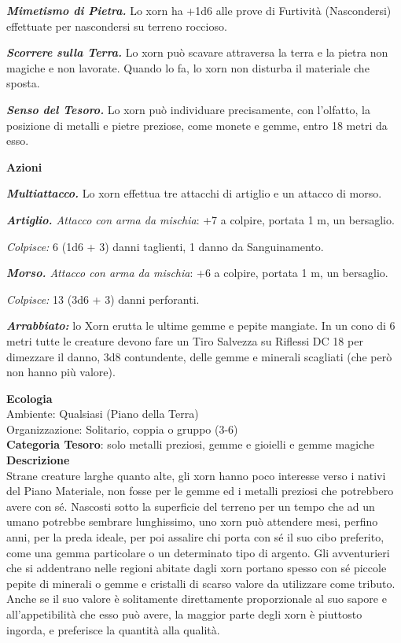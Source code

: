 \begin{multicols}{2}
{\emph{\textbf{Mimetismo di Pietra.}} Lo xorn ha +1d6 alle prove di Furtività (Nascondersi) effettuate per nascondersi su terreno roccioso.

\emph{\textbf{Scorrere sulla Terra.}} Lo xorn può scavare attraversa la terra e la pietra non magiche e non lavorate. Quando lo fa, lo xorn non disturba il materiale che sposta.

\emph{\textbf{Senso del Tesoro.}} Lo xorn può individuare precisamente, con l'olfatto, la posizione di metalli e pietre preziose, come monete e gemme, entro 18 metri da esso.

\textbf{Azioni}

\emph{\textbf{Multiattacco.}} Lo xorn effettua tre attacchi di artiglio e un attacco di morso.

\emph{\textbf{Artiglio.} Attacco con arma da mischia}: +7 a colpire, portata 1 m, un bersaglio.

\emph{Colpisce:} 6 (1d6 + 3) danni taglienti, 1 danno da Sanguinamento.

\emph{\textbf{Morso.} Attacco con arma da mischia}: +6 a colpire, portata 1 m, un bersaglio.

\emph{Colpisce:} 13 (3d6 + 3) danni perforanti.

\emph{\textbf{Arrabbiato:}} lo Xorn erutta le ultime gemme e pepite mangiate. In un cono di 6 metri tutte le creature devono fare un Tiro Salvezza su Riflessi DC 18 per dimezzare il danno, 3d8 contundente, delle gemme e minerali scagliati (che però non hanno più valore).

\textbf{Ecologia}\\
Ambiente: Qualsiasi (Piano della Terra)\\
Organizzazione: Solitario, coppia o gruppo (3-6)\\
\textbf{Categoria Tesoro}: solo metalli preziosi, gemme e gioielli e gemme magiche\\
\textbf{Descrizione}\\
Strane creature larghe quanto alte, gli xorn hanno poco interesse verso i nativi del Piano Materiale, non fosse per le gemme ed i metalli preziosi che potrebbero avere con sé. Nascosti sotto la superficie del terreno per un tempo che ad un umano potrebbe sembrare lunghissimo, uno xorn può attendere mesi, perfino anni, per la preda ideale, per poi assalire chi porta con sé il suo cibo preferito, come una gemma particolare o un determinato tipo di argento. Gli avventurieri che si addentrano nelle regioni abitate dagli xorn portano spesso con sé piccole pepite di minerali o gemme e cristalli di scarso valore da utilizzare come tributo. Anche se il suo valore è solitamente direttamente proporzionale al suo sapore e all'appetibilità che esso può avere, la maggior parte degli xorn è piuttosto ingorda, e preferisce la quantità alla qualità.

}
\end{multicols}
